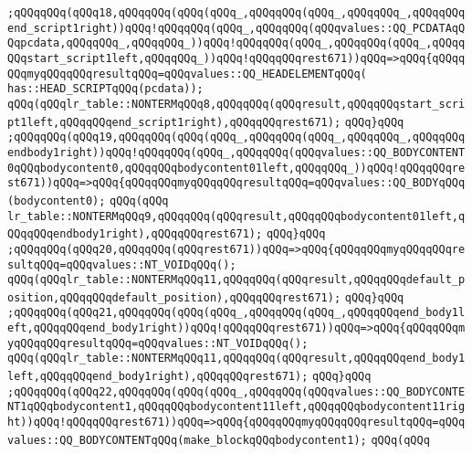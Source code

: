\verb|;qQQqqQQq(qQQq18,qQQqqQQq(qQQq(qQQq_,qQQqqQQq(qQQq_,qQQqqQQq_,qQQqqQQqend_script1right))qQQq!qQQqqQQq(qQQq_,qQQqqQQq(qQQqvalues::QQ_PCDATAqQQqpcdata,qQQqqQQq_,qQQqqQQq_))qQQq!qQQqqQQq(qQQq_,qQQqqQQq(qQQq_,qQQqqQQqstart_script1left,qQQqqQQq_))qQQq!qQQqqQQqrest671))qQQq=>qQQq{qQQqqQQqmyqQQqqQQqresultqQQq=qQQqvalues::QQ_HEADELEMENTqQQq(|\newline
\verb|has::HEAD_SCRIPTqQQq(pcdata));|\newline
\verb|qQQq(qQQqlr_table::NONTERMqQQq8,qQQqqQQq(qQQqresult,qQQqqQQqstart_script1left,qQQqqQQqend_script1right),qQQqqQQqrest671);|\newline
\verb|qQQq}qQQq|\newline
\verb|;qQQqqQQq(qQQq19,qQQqqQQq(qQQq(qQQq_,qQQqqQQq(qQQq_,qQQqqQQq_,qQQqqQQqendbody1right))qQQq!qQQqqQQq(qQQq_,qQQqqQQq(qQQqvalues::QQ_BODYCONTENT0qQQqbodycontent0,qQQqqQQqbodycontent01left,qQQqqQQq_))qQQq!qQQqqQQqrest671))qQQq=>qQQq{qQQqqQQqmyqQQqqQQqresultqQQq=qQQqvalues::QQ_BODYqQQq(bodycontent0);|\newline
\verb|qQQq(qQQq|\newline
\verb|lr_table::NONTERMqQQq9,qQQqqQQq(qQQqresult,qQQqqQQqbodycontent01left,qQQqqQQqendbody1right),qQQqqQQqrest671);|\newline
\verb|qQQq}qQQq|\newline
\verb|;qQQqqQQq(qQQq20,qQQqqQQq(qQQqrest671))qQQq=>qQQq{qQQqqQQqmyqQQqqQQqresultqQQq=qQQqvalues::NT_VOIDqQQq();|\newline
\verb|qQQq(qQQqlr_table::NONTERMqQQq11,qQQqqQQq(qQQqresult,qQQqqQQqdefault_position,qQQqqQQqdefault_position),qQQqqQQqrest671);|\newline
\verb|qQQq}qQQq|\newline
\verb|;qQQqqQQq(qQQq21,qQQqqQQq(qQQq(qQQq_,qQQqqQQq(qQQq_,qQQqqQQqend_body1left,qQQqqQQqend_body1right))qQQq!qQQqqQQqrest671))qQQq=>qQQq{qQQqqQQqmyqQQqqQQqresultqQQq=qQQqvalues::NT_VOIDqQQq();|\newline
\verb|qQQq(qQQqlr_table::NONTERMqQQq11,qQQqqQQq(qQQqresult,qQQqqQQqend_body1left,qQQqqQQqend_body1right),qQQqqQQqrest671);|\newline
\verb|qQQq}qQQq|\newline
\verb|;qQQqqQQq(qQQq22,qQQqqQQq(qQQq(qQQq_,qQQqqQQq(qQQqvalues::QQ_BODYCONTENT1qQQqbodycontent1,qQQqqQQqbodycontent11left,qQQqqQQqbodycontent11right))qQQq!qQQqqQQqrest671))qQQq=>qQQq{qQQqqQQqmyqQQqqQQqresultqQQq=qQQqvalues::QQ_BODYCONTENTqQQq(make_blockqQQqbodycontent1);|\newline
\verb|qQQq(qQQq|\newline
